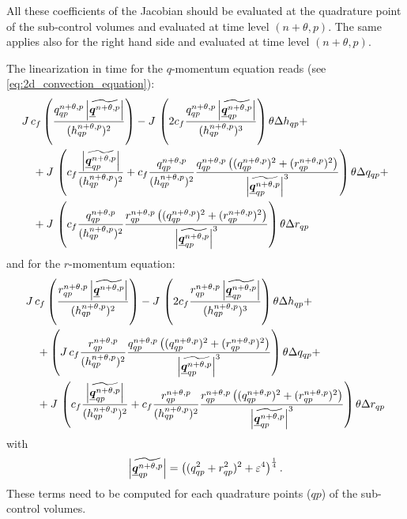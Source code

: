 All these coefficients of the Jacobian should be evaluated at the quadrature point of the sub-control volumes and evaluated at time level $(n+\theta,p)$.
The same applies also for the right hand side and evaluated at time level $(n+\theta,p)$.

The linearization in time for the $q$-momentum equation reads (see \autoref{eq:2d_convection_equation}):
\begin{align}
        &J\, c_f \left( \frac{q^{n+\theta,p}_{qp}\left\lvert \widetilde{\mbox{\boldmath $\underline{q}$}^{n+\theta,p}} \right\rvert}{(h^{n+\theta,p}_{qp})^2} \right)
        - J\, \left( 2 c_f \frac{ q^{n+\theta,p}_{qp} \left\lvert \widetilde{\mbox{\boldmath $\underline{q}$}^{n+\theta,p}_{qp}} \right\rvert }{(h^{n+\theta,p}_{qp})^3} \right) \theta \Delta h_{qp} +
        \\*
        & \quad +
        J\, \left( c_f \frac{\left\lvert \widetilde{\mbox{\boldmath $\underline{q}$}^{n+\theta,p}_{qp}} \right\rvert}{(h^{n+\theta,p}_{qp})^2}
        + c_f \frac{q^{n+\theta,p}_{qp}}{(h^{n+\theta,p}_{qp})^2} \frac{q^{n+\theta,p}_{qp}\left( (q^{n+\theta,p}_{qp})^2 + (r^{n+\theta,p}_{qp})^2 \right) }{\left\lvert \widetilde{\mbox{\boldmath $\underline{q}$}^{n+\theta,p}_{qp}} \right\rvert^3} \right) \theta \Delta q_{qp} +
        \\*
        & \quad + J\, \left( c_f \frac{q^{n+\theta,p}_{qp}}{(h^{n+\theta,p}_{qp})^2}
        \frac{ r^{n+\theta,p}_{qp} \left( (q^{n+\theta,p}_{qp})^2 + (r^{n+\theta,p}_{qp})^2  \right)}
        {\left\lvert \widetilde{\mbox{\boldmath $\underline{q}$}^{n+\theta,p}_{qp}} \right\rvert^3 } \right) \theta \Delta r_{qp}
 \end{align}
and for the $r$-momentum equation:
\begin{align}
        &J\, c_f \left( \frac{r^{n+\theta,p}_{qp}\left\lvert \widetilde{\mbox{\boldmath $\underline{q}$}^{n+\theta,p}} \right\rvert}{(h^{n+\theta,p}_{qp})^2} \right)
        - J\, \left( 2 c_f \frac{ r^{n+\theta,p}_{qp} \left\lvert \widetilde{\mbox{\boldmath $\underline{q}$}^{n+\theta,p}_{qp}} \right\rvert} {(h^{n+\theta,p}_{qp})^3} \right) \theta \Delta h_{qp} +
        \\*
        & \quad + \left(
         J\, c_f \frac{r^{n+\theta,p}_{qp}}{(h^{n+\theta,p}_{qp})^2}\frac{q^{n+\theta,p}_{qp}\left( (q^{n+\theta,p}_{qp})^2 + (r^{n+\theta,p}_{qp})^2 \right)}
        {\left\lvert \widetilde{\mbox{\boldmath $\underline{q}$}^{n+\theta,p}_{qp}} \right\rvert^3 }
        \right) \theta \Delta q_{qp} +
        \\*
        &\quad + J\, \left( c_f \frac{\left\lvert \widetilde{\mbox{\boldmath $\underline{q}$}^{n+\theta,p}_{qp}} \right\rvert}{(h^{n+\theta,p}_{qp})^2}
        + c_f \frac{r^{n+\theta,p}_{qp}}{(h^{n+\theta,p}_{qp})^2} \frac{r^{n+\theta,p}_{qp}\left( (q^{n+\theta,p}_{qp})^2 + (r^{n+\theta,p}_{qp})^2 \right) }{\left\lvert \widetilde{\mbox{\boldmath $\underline{q}$}^{n+\theta,p}_{qp}} \right\rvert^3}  \right) \theta \Delta r_{qp}
\end{align}
with
\begin{align}
    \left\lvert \widetilde{\mbox{\boldmath $\underline{q}$}^{n+\theta,p}_{qp}} \right\rvert = \left( (q^2_{qp} + r^2_{qp})^2 + \varepsilon^4 \right)^{\frac{1}{4}}.
\end{align}
These terms need to be computed for each quadrature points ($qp$) of the sub-control volumes.
